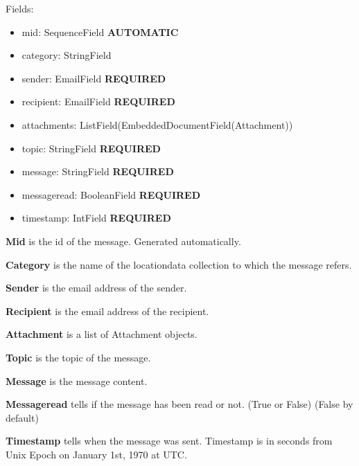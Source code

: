 \documentclass[letterpaper,10pt,english]{sphinxmanual}
\begin{document}
\begin{fulllineitems}
\label{codedoc/msgdoc:lbd_backend.LBD_REST_messagedata.models.Message}
Fields:
\begin{itemize}
\item {} 
mid: SequenceField \textbf{AUTOMATIC}

\item {} 
category: StringField

\item {} 
sender: EmailField \textbf{REQUIRED}

\item {} 
recipient: EmailField \textbf{REQUIRED}

\item {} 
attachments: ListField(EmbeddedDocumentField(Attachment))

\item {} 
topic: StringField \textbf{REQUIRED}

\item {} 
message: StringField \textbf{REQUIRED}

\item {} 
messageread: BooleanField \textbf{REQUIRED}

\item {} 
timestamp: IntField \textbf{REQUIRED}

\end{itemize}

\textbf{Mid} is the id of the message. Generated automatically.

\textbf{Category} is the name of the locationdata collection to which the message refers.

\textbf{Sender} is the email address of the sender.

\textbf{Recipient} is the email address of the recipient.

\textbf{Attachment} is a list of Attachment objects.

\textbf{Topic} is the topic of the message.

\textbf{Message} is the message content.

\textbf{Messageread} tells if the message has been read or not. (True or False) (False by default)

\textbf{Timestamp} tells when the message was sent. Timestamp is in seconds from Unix Epoch on January 1st, 1970 at UTC.

\end{fulllineitems}
\end{document}
